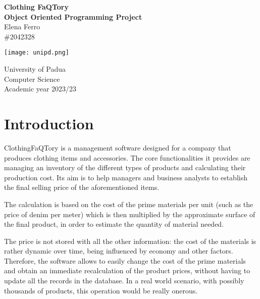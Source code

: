 \documentclass[10pt]{article}
\begin{document}
\begin{titlepage}

    \begin{center}
        \vspace*{1cm}
        \Huge
        \textbf{Clothing FaQTory}\\
        \LARGE
        \textbf{Object Oriented Programming Project}\\
        \vspace{1cm}
        \Large
        Elena Ferro\\
        \large
        \#2042328

        \vspace{10cm}

        \texttt{[image: unipd.png]}

        \Large
        \vspace{1cm}
        University of Padua\\
        \vspace{0.3cm}
        {\large Computer Science\\}
        \vspace{0.3cm}
        Academic year 2023/23

    \end{center}
\end{titlepage}
\tableofcontents
\newpage
\pagestyle{fancy}
\section{Introduction}
ClothingFaQTory is a management software designed for a company that produces
clothing items and accessories. The core functionalities it provides are
managing an inventory of the different types of products and calculating their
production cost. Its aim is to help managers and business analysts to establish
the final selling price of the aforementioned items.

The calculation is based on the cost of the prime materials per unit (such as
the price of denim per meter) which is then multiplied by the approximate
surface of the final product, in order to estimate the quantity of material
needed.

The price is not stored with all the other information: the cost of the
materials is rather dynamic over time, being influenced by economy and other
factors. Therefore, the software allows to easily change the cost of the prime
materials and obtain an immediate recalculation of the product prices, without
having to update all the records in the database. In a real world scenario,
with possibly thousands of products, this operation would be really onerous.
\end{document}
